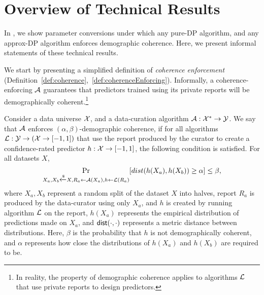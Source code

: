 \section{Overview of Technical Results}\label{sec:overview-of-technical-results}

In , we show parameter conversions under which any pure-DP algorithm, and any approx-DP algorithm enforces demographic coherence. 
Here, we present informal statements of these technical results.

We start by presenting a simplified definition of \emph{coherence enforcement} (Definition~\ref{def:coherence},~\ref{def:coherenceEnforcing}). 
Informally, a coherence-enforcing $\mathcal{A}$ guarantees that predictors trained using its private reports will be demographically coherent.\footnote{In reality, the property of demographic coherence applies to algorithms $\mathcal{L}$ that use private reports to design predictors.} 

\begin{definition}\label{informaldef:coherence}
Consider a data universe $\mathcal{X}$, and a data-curation algorithm $\mathcal{A}: \mathcal{X}^* \to \mathcal{Y}$. We say that $\mathcal{A}$ enforces $(\alpha, \beta)$-demographic coherence, if for all algorithms $\mathcal{L}: \mathcal{Y} \to (\mathcal{X} \to [-1,1])$ that use the report produced by the curator to create a confidence-rated predictor $h: \mathcal{X} \to [-1,1]$, the following condition is satisfied. For all datasets $X$, 
$$ 
\Pr_{X_a,X_b \xleftarrow{\$} X, R_a \leftarrow \mathcal{A}(X_a), h \leftarrow \mathcal{L}(R_a)}[dist(h(X_a), h(X_b)) \geq \alpha] \leq \beta,$$
where $X_a, X_b$ represent a random split of the dataset $X$ into halves, report $R_a $ is produced by the data-curator using only $X_a$, and $h$ is created by running algorithm $\mathcal{L}$ on the report, $h(X_a)$ represents the empirical distribution of predictions made on $X_a$, and $\mathsf{dist}(\cdot,\cdot)$ represents a metric distance between distributions. 
Here, $\beta$ is the probability that $h$ is not demographically coherent, and $\alpha$ represents how close the distributions of $h(X_a)$ and $h(X_b)$ are required to be.
\end{definition}

